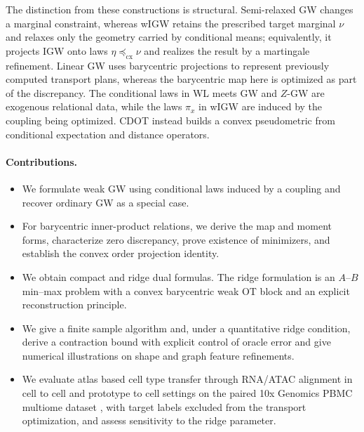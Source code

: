 \documentclass[11pt]{article}
\newcommand{\cx}{\preceq_{\mathrm{cx}}}
\theoremstyle{plain}
\theoremstyle{definition}
\theoremstyle{remark}
\begin{document}
The distinction from these constructions is structural. Semi-relaxed GW changes a
marginal constraint, whereas wIGW retains the prescribed target marginal $\nu$ and
relaxes only the geometry carried by conditional means; equivalently, it projects IGW
onto laws $\eta\cx\nu$ and realizes the result by a martingale refinement. Linear GW
uses barycentric projections to represent previously computed transport plans, whereas
the barycentric map here is optimized as part of the discrepancy. The conditional laws
in WL meets GW and $Z$-GW are exogenous relational data, while the laws $\pi_x$ in
wIGW are induced by the coupling being optimized. CDOT instead builds a convex
pseudometric from conditional expectation and distance operators.

\FloatBarrier
\paragraph{Contributions.}
\begin{itemize}[leftmargin=2em]
\item We formulate weak GW using conditional laws induced by a coupling and recover
ordinary GW as a special case.
\item For barycentric inner-product relations, we derive the map and moment forms,
characterize zero discrepancy, prove existence of minimizers, and establish the
convex order projection identity.
\item We obtain compact and ridge dual formulas. The ridge formulation is an
$A$--$B$ min--max problem with a convex barycentric weak OT block and an explicit
reconstruction principle.
\item We give a finite sample algorithm and, under a quantitative ridge condition,
derive a contraction bound with explicit control of oracle error and give numerical
illustrations on shape and graph feature refinements.
\item We evaluate atlas based cell type transfer through RNA/ATAC alignment in
cell to cell and prototype to cell settings on the paired 10x Genomics PBMC
multiome dataset \cite{TenXPBMC}, with target labels excluded from the transport
optimization, and assess sensitivity to the ridge parameter.
\end{itemize}
\end{document}
